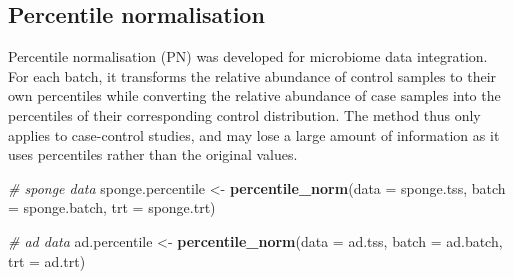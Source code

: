 \documentclass[]{book}
\newenvironment{Shaded}{\begin{snugshade}}{\end{snugshade}}
\newcommand{\KeywordTok}[1]{\textcolor[rgb]{0.13,0.29,0.53}{\textbf{#1}}}
\newcommand{\DataTypeTok}[1]{\textcolor[rgb]{0.13,0.29,0.53}{#1}}
\newcommand{\StringTok}[1]{\textcolor[rgb]{0.31,0.60,0.02}{#1}}
\newcommand{\CommentTok}[1]{\textcolor[rgb]{0.56,0.35,0.01}{\textit{#1}}}
\newcommand{\OperatorTok}[1]{\textcolor[rgb]{0.81,0.36,0.00}{\textbf{#1}}}
\newcommand{\NormalTok}[1]{#1}
\begin{document}
\begin{Shaded}
\end{Shaded}

\subsection{Percentile normalisation}\label{percentile-normalisation}

Percentile normalisation (PN) was developed for microbiome data
integration. For each batch, it transforms the relative abundance of
control samples to their own percentiles while converting the relative
abundance of case samples into the percentiles of their corresponding
control distribution. The method thus only applies to case-control
studies, and may lose a large amount of information as it uses
percentiles rather than the original values.

\begin{Shaded}
\begin{Highlighting}[]
\CommentTok{# sponge data}
\NormalTok{sponge.percentile <-}\StringTok{ }\KeywordTok{percentile_norm}\NormalTok{(}\DataTypeTok{data =}\NormalTok{ sponge.tss, }\DataTypeTok{batch =}\NormalTok{ sponge.batch, }
                                    \DataTypeTok{trt =}\NormalTok{ sponge.trt)}

\CommentTok{# ad data}
\NormalTok{ad.percentile <-}\StringTok{ }\KeywordTok{percentile_norm}\NormalTok{(}\DataTypeTok{data =}\NormalTok{ ad.tss, }\DataTypeTok{batch =}\NormalTok{ ad.batch, }
                                \DataTypeTok{trt =}\NormalTok{ ad.trt)}
\end{Highlighting}
\end{Shaded}
\end{document}
